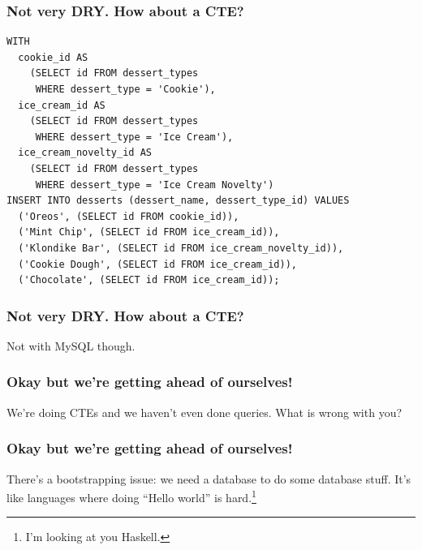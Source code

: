 \documentclass[aspectratio=169]{beamer}
\begin{document}
\begin{frame}[fragile]
  \frametitle{Not very DRY. How about a CTE?}
  \begin{lstlisting}
WITH
  cookie_id AS
    (SELECT id FROM dessert_types
     WHERE dessert_type = 'Cookie'),
  ice_cream_id AS
    (SELECT id FROM dessert_types
     WHERE dessert_type = 'Ice Cream'),
  ice_cream_novelty_id AS
    (SELECT id FROM dessert_types
     WHERE dessert_type = 'Ice Cream Novelty')
INSERT INTO desserts (dessert_name, dessert_type_id) VALUES
  ('Oreos', (SELECT id FROM cookie_id)),
  ('Mint Chip', (SELECT id FROM ice_cream_id)),
  ('Klondike Bar', (SELECT id FROM ice_cream_novelty_id)),
  ('Cookie Dough', (SELECT id FROM ice_cream_id)),
  ('Chocolate', (SELECT id FROM ice_cream_id));

  \end{lstlisting}
\end{frame}

\begin{frame}[fragile]
  \frametitle{Not very DRY. How about a CTE?}
  Not with MySQL though.
\end{frame}

\begin{frame}[fragile]
  \frametitle{Okay but we're getting ahead of ourselves!}

  We're doing CTEs and we haven't even done queries. What is wrong with you?
\end{frame}

\begin{frame}[fragile]
  \frametitle{Okay but we're getting ahead of ourselves!}

  There's a bootstrapping issue: we need a database to do some database
  stuff. It's like languages where doing ``Hello world'' is
  hard.\footnote{I'm looking at you Haskell.}
\end{frame}
\end{document}
